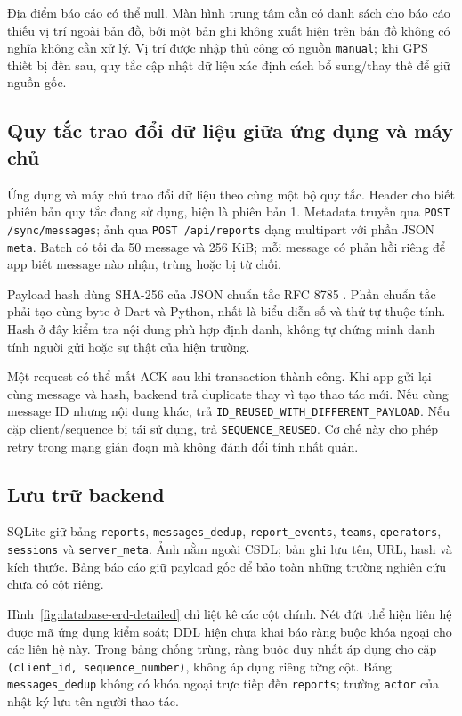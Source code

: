 Địa điểm báo cáo có thể null. Màn hình trung tâm cần có danh sách cho báo cáo thiếu vị trí ngoài bản đồ, bởi một bản ghi không xuất hiện trên bản đồ không có nghĩa không cần xử lý. Vị trí được nhập thủ công có nguồn \texttt{manual}; khi GPS thiết bị đến sau, quy tắc cập nhật dữ liệu xác định cách bổ sung/thay thế để giữ nguồn gốc.

\subsection{Quy tắc trao đổi dữ liệu giữa ứng dụng và máy chủ}
Ứng dụng và máy chủ trao đổi dữ liệu theo cùng một bộ quy tắc. Header  cho biết phiên bản quy tắc đang sử dụng, hiện là phiên bản 1. Metadata truyền qua \texttt{POST /sync/messages}; ảnh qua \texttt{POST /api/reports} dạng multipart với phần JSON \texttt{meta}. Batch có tối đa 50 message và 256 KiB; mỗi message có phản hồi riêng để app biết message nào nhận, trùng hoặc bị từ chối.

Payload hash dùng SHA-256 của JSON chuẩn tắc RFC 8785 \citep{rfc8785}. Phần chuẩn tắc phải tạo cùng byte ở Dart và Python, nhất là biểu diễn số và thứ tự thuộc tính. Hash ở đây kiểm tra nội dung phù hợp định danh, không tự chứng minh danh tính người gửi hoặc sự thật của hiện trường.

Một request có thể mất ACK sau khi transaction thành công. Khi app gửi lại cùng message và hash, backend trả duplicate thay vì tạo thao tác mới. Nếu cùng message ID nhưng nội dung khác, trả \texttt{ID\_REUSED\_WITH\_DIFFERENT\_PAYLOAD}. Nếu cặp client/sequence bị tái sử dụng, trả \texttt{SEQUENCE\_REUSED}. Cơ chế này cho phép retry trong mạng gián đoạn mà không đánh đổi tính nhất quán.

\subsection{Lưu trữ backend}
SQLite giữ bảng \texttt{reports}, \texttt{messages\_dedup}, \texttt{report\_events}, \texttt{teams}, \texttt{operators}, \texttt{sessions} và \texttt{server\_meta}. Ảnh nằm ngoài CSDL; bản ghi lưu tên, URL, hash và kích thước. Bảng báo cáo giữ payload gốc để bảo toàn những trường nghiên cứu chưa có cột riêng.

Hình~\ref{fig:database-erd-detailed} chỉ liệt kê các cột chính. Nét đứt thể hiện liên hệ được mã ứng dụng kiểm soát; DDL hiện chưa khai báo ràng buộc khóa ngoại cho các liên hệ này. Trong bảng chống trùng, ràng buộc duy nhất áp dụng cho cặp \texttt{(client\_id, sequence\_number)}, không áp dụng riêng từng cột. Bảng \texttt{messages\_dedup} không có khóa ngoại trực tiếp đến \texttt{reports}; trường \texttt{actor} của nhật ký lưu tên người thao tác.

